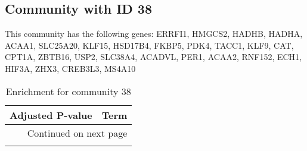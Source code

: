 \subsection*{Community with ID 38}
This community has the following genes: ERRFI1, HMGCS2, HADHB, HADHA, ACAA1, SLC25A20, KLF15, HSD17B4, FKBP5, PDK4, TACC1, KLF9, CAT, CPT1A, ZBTB16, USP2, SLC38A4, ACADVL, PER1, ACAA2, RNF152, ECH1, HIF3A, ZHX3, CREB3L3, MS4A10
\\
\begin{longtable}{p{2.4cm}p{14.5cm}}
\caption{Enrichment for community 38}\\
\toprule
Adjusted \newline P-value &                                                                                         Term \\
\midrule
\endhead
\midrule
\multicolumn{2}{r}{{Continued on next page}} \\
\midrule
\endfoot


\end{longtable}
